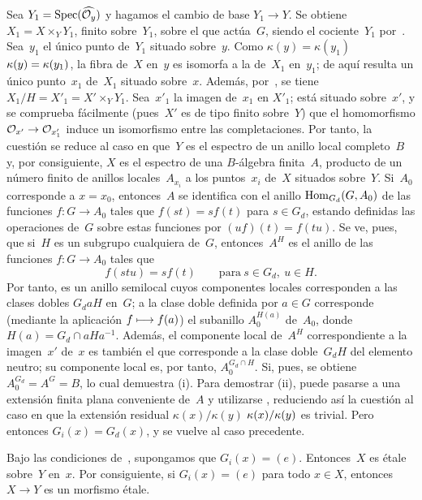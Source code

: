 Sea $Y_1=\Spec(\widehat{\cal{O}_y})$ y hagamos el cambio de base
$Y_1\to Y$. Se obtiene $X_1=X\times_Y Y_1$, finito sobre~$Y_1$, sobre el
que actúa~$G$, siendo el cociente~$Y_1$ por~. Sea~$y_1$ el único
punto de~$Y_1$ situado sobre~$y$. Como
{$\kappa(y)=\kappa(y_1)$}
{$\kres(y)=\kres(y_1)$},
la fibra de~$X$ en~$y$ es isomorfa a la de~$X_1$ en~$y_1$; de aquí resulta
un único punto~$x_1$ de~$X_1$ situado sobre~$x$. Además, por~,
se tiene $X_1/H=X'_1=X'\times_Y Y_1$. Sea~$x'_1$ la imagen de~$x_1$ en
$X'_1$; está situado sobre~$x'$, y se comprueba fácilmente (pues~$X'$ es de
tipo finito sobre~$Y$) que el homomorfismo
$\cal{O}_{x'}\to\cal{O}_{x'_1}$ induce un isomorfismo entre las
completaciones. Por tanto, la cuestión se reduce al caso en que~$Y$ es el
espectro de un anillo local completo~$B$ y, por consiguiente, $X$ es el
espectro de una $B$-álgebra finita~$A$, producto de un número finito de
anillos locales~$A_{x_i}$
a los puntos~$x_i$ de~$X$ situados sobre~$Y$. Si~$A_0$ corresponde a
$x=x_0$, entonces~$A$ se identifica con el anillo
$\Hom_{G_d}(G,A_0)$ de las funciones $f\colon G\to A_0$ tales que
$f(st)=sf(t)$ para $s\in G_d$, estando definidas las operaciones de~$G$ sobre
estas funciones por $(uf)(t)=f(tu)$. Se ve, pues, que si~$H$ es un subgrupo
cualquiera de~$G$, entonces~$A^H$ es el anillo de las funciones
$f\colon G\to A_0$ tales que
$$
f(stu)=sf(t)\qquad\text{para}\ s\in G_d,\ u\in H.
$$
Por tanto, es un anillo semilocal cuyos componentes locales corresponden a
las clases dobles $G_daH$ en~$G$; a la clase doble definida por $a\in G$
corresponde (mediante la aplicación $f\mto f(a)$) el subanillo
$A_0^{H(a)}$ de~$A_0$, donde $H(a)=G_d\cap aHa^{-1}$. Además, el componente
local de~$A^H$ correspondiente a la imagen~$x'$ de~$x$ es también el que
corresponde a la clase doble~$G_dH$ del elemento neutro; su componente local
es, por tanto, $A_0^{G_d\cap H}$. Si, pues,
se obtiene $A_0^{G_d}=A^G=B$, lo cual demuestra (i). Para demostrar (ii),
puede pasarse a una extensión finita plana conveniente de~$A$ y utilizarse
, reduciendo así la cuestión al caso en que la extensión residual
{$\kappa(x)/\kappa(y)$}
{$\kres(x)/\kres(y)$}
es trivial. Pero entonces $G_i(x)=G_d(x)$, y se vuelve al caso precedente.

\begin{corollaire}
\label{V.2.3}
Bajo
las condiciones de~, supongamos que $G_i(x)=(e)$. Entonces~$X$
es étale sobre~$Y$ en~$x$. Por consiguiente, si $G_i(x)=(e)$ para todo
$x\in X$, entonces $X\to Y$ es un morfismo étale.
\end{corollaire}

